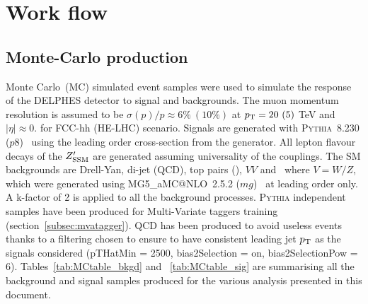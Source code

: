 \section{Work flow}
\label{sec:fccworkflow}

\subsection{Monte-Carlo production}
\label{subsec:mcprod}

Monte Carlo~(MC) simulated event samples were used to simulate the response of the DELPHES detector to signal and backgrounds. The muon momentum resolution is assumed to be $\sigma(p)/p \approx 6\%~(10\%)$ at $p_{\text{T}}= 20~(5)$ TeV and $|\eta| \approx 0.$ for FCC-hh (HE-LHC) scenario. Signals are generated with {\scshape Pythia}~8.230 ($p8$)~\cite{Sjostrand:2014zea} using the leading order cross-section from the generator.
All lepton flavour decays of the $Z^{\prime}_{\mathrm{SSM}}$ are generated assuming universality of the couplings.
The SM backgrounds are Drell-Yan, di-jet (QCD), top pairs (\ttbar), $VV$ and \vj\ where $V=W/Z$, which were generated using {\scshape MG5\_}a{\scshape MC@NLO}~2.5.2 ($mg$)~\cite{Alwall:2014hca} at leading order only. A k-factor of 2 is applied to all the background processes. \newline
{\scshape Pythia} independent samples have been produced for Multi-Variate taggers training (section~\ref{subsec:mvatagger}). QCD has been produced to avoid useless events thanks to a filtering chosen to ensure to have consistent leading jet $p\sb{\scriptstyle\mathrm{T}}$ as the signals considered (pTHatMin = 2500, bias2Selection = on, bias2SelectionPow = 6).\newline
Tables~\ref{tab:MCtable_bkgd} and ~\ref{tab:MCtable_sig} are summarising all the background and signal samples produced for the various analysis presented in this document.

